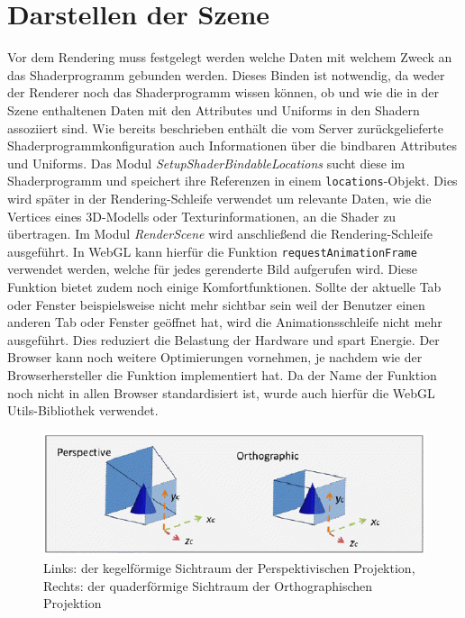 \section{Darstellen der Szene}
Vor dem Rendering muss festgelegt werden welche Daten mit welchem Zweck an das Shaderprogramm gebunden werden. Dieses Binden ist notwendig, da weder der Renderer noch das Shaderprogramm wissen können, ob und wie die in der Szene enthaltenen Daten mit den Attributes und Uniforms in den Shadern assoziiert sind. Wie bereits beschrieben enthält die vom Server zurückgelieferte Shaderprogrammkonfiguration auch Informationen über die bindbaren Attributes und Uniforms. Das Modul \textit{SetupShaderBindableLocations} sucht diese im Shaderprogramm und speichert ihre Referenzen in einem \texttt{locations}-Objekt. Dies wird später in der Rendering-Schleife verwendet um relevante Daten, wie die Vertices eines 3D-Modells oder Texturinformationen, an die Shader zu übertragen. Im Modul \textit{RenderScene} wird anschließend die Rendering-Schleife ausgeführt. In WebGL kann hierfür die Funktion \texttt{requestAnimationFrame} verwendet werden, welche für jedes gerenderte Bild aufgerufen wird. Diese Funktion bietet zudem noch einige Komfortfunktionen. Sollte der aktuelle Tab oder Fenster beispielsweise nicht mehr sichtbar sein weil der Benutzer einen anderen Tab oder Fenster geöffnet hat, wird die Animationsschleife nicht mehr ausgeführt. Dies reduziert die Belastung der Hardware und spart Energie. Der Browser kann noch weitere Optimierungen vornehmen, je nachdem wie der Browserhersteller die Funktion implementiert hat. Da der Name der Funktion noch nicht in allen Browser standardisiert ist, wurde auch hierfür die WebGL Utils-Bibliothek verwendet.
\begin{figure}
\centering
\includegraphics[width=\textwidth]{bilder/views.png}
\caption{Links: der kegelförmige Sichtraum der Perspektivischen Projektion, Rechts: der quaderförmige Sichtraum der Orthographischen Projektion\autocite{WebGLBeginnersGuide}}
\label{fig:views}
\end{figure}

